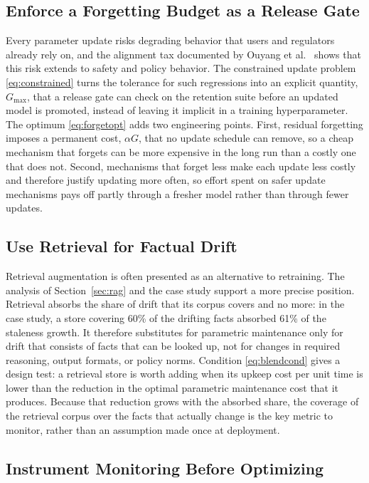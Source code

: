 \documentclass[electronics,article,submit,pdftex,moreauthors]{Definitions/mdpi}
\newcommand{\Gmax}{G_{\max}}
\begin{document}
\subsection{Enforce a Forgetting Budget as a Release Gate}

Every parameter update risks degrading behavior that users and regulators already rely on, and the alignment tax documented by Ouyang et al.~\cite{Ouyang2022} shows that this risk extends to safety and policy behavior. The constrained update problem \eqref{eq:constrained} turns the tolerance for such regressions into an explicit quantity, $\Gmax$, that a release gate can check on the retention suite before an updated model is promoted, instead of leaving it implicit in a training hyperparameter. The optimum \eqref{eq:forgetopt} adds two engineering points. First, residual forgetting imposes a permanent cost, $\alpha G$, that no update schedule can remove, so a cheap mechanism that forgets can be more expensive in the long run than a costly one that does not. Second, mechanisms that forget less make each update less costly and therefore justify updating more often, so effort spent on safer update mechanisms pays off partly through a fresher model rather than through fewer updates.

\subsection{Use Retrieval for Factual Drift}

Retrieval augmentation is often presented as an alternative to retraining. The analysis of Section~\ref{sec:rag} and the case study support a more precise position. Retrieval absorbs the share of drift that its corpus covers and no more: in the case study, a store covering 60\% of the drifting facts absorbed 61\% of the staleness growth. It therefore substitutes for parametric maintenance only for drift that consists of facts that can be looked up, not for changes in required reasoning, output formats, or policy norms. Condition \eqref{eq:blendcond} gives a design test: a retrieval store is worth adding when its upkeep cost per unit time is lower than the reduction in the optimal parametric maintenance cost that it produces. Because that reduction grows with the absorbed share, the coverage of the retrieval corpus over the facts that actually change is the key metric to monitor, rather than an assumption made once at deployment.

\subsection{Instrument Monitoring Before Optimizing}
\end{document}
